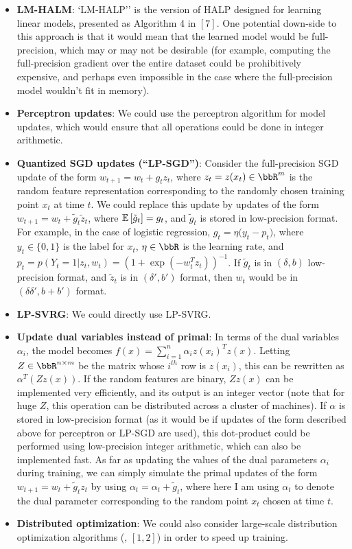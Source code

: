 \documentclass[12pt]{article}
\newcommand{\tg}{\tilde{g}}
\newcommand{\tz}{\tilde{z}}
\begin{document}
\begin{itemize}
\item \textbf{LM-HALM}: `LM-HALP'' is the version of HALP designed for learning linear models, presented as Algorithm 4 in $[7]$. One potential down-side to this approach is that it would mean that the learned model would be full-precision, which may or may not be desirable (for example, computing the full-precision gradient over the entire dataset could be prohibitively expensive, and perhaps even impossible in the case where the full-precision model wouldn't fit in memory).
\item \textbf{Perceptron updates}: We could use the perceptron algorithm for model updates, 
which would ensure that all operations could be done in integer arithmetic.
\item\textbf{Quantized SGD updates (``LP-SGD'')}: Consider the full-precision SGD update of
the form $w_{t+1} = w_t + g_t z_t$, where $z_t = z(x_t) \in \RR^m$ is the random
feature representation corresponding to the randomly chosen training point $x_t$ at
time $t$.  We could replace this update by updates of the form 
$w_{t+1} = w_t + \tg_t \tz_t$, where $\expect{}{\tg_t} = g_t$, and $\tg_t$ is stored in
low-precision format.  For example, in the case of logistic regression, 
$g_t = \eta \big(y_t - p_t\big)$, where $y_t\in\{0,1\}$ is the label for $x_t$, $\eta \in \RR$ is the learning
rate, and $p_t = p(Y_t=1|z_t,w_t) = (1+\exp(-w_t^Tz_t))^{-1}$. 
If $\tg_t$ is in $(\delta,b)$ low-precision format, and $\tz_t$ is in
$(\delta',b')$ format, then $w_t$ would be in $(\delta\delta',b+b')$ format.
\item \textbf{LP-SVRG}: We could directly use LP-SVRG.
\item \textbf{Update dual variables instead of primal}: In terms of the dual variables $\alpha_i$, the
model becomes $f(x) = \sum_{i=1}^n \alpha_i z(x_i)^T z(x)$. Letting 
$Z\in \RR^{n\times m}$ be the matrix whose $i^{th}$ row is $z(x_i)$, this can be
rewritten as $\alpha^T (Z z(x))$.  If the random features are binary, $Zz(x)$ 
can be implemented very efficiently, and its output is an integer vector (note that for huge $Z$,
this operation can be distributed across a cluster of machines).
If $\alpha$ is stored in low-precision format (as it would be if updates of the form described above
for perceptron or LP-SGD are used), this dot-product could be performed using low-precision
integer arithmetic, which can also be implemented fast.  As far as updating the values of
the dual parameters $\alpha_i$ during training, we can simply simulate the primal updates of the form 
$w_{t+1} = w_t + \tg_t z_t$ by using $\alpha_t = \alpha_t + \tg_t$, where here I am using 
$\alpha_t$ to denote the dual parameter corresponding to the random point $x_t$ chosen at time $t$.
\item \textbf{Distributed optimization}: We could also consider large-scale distribution optimization algorithms (\eg, $[1,2]$) in order to speed up training.
\end{itemize}
\end{document}

